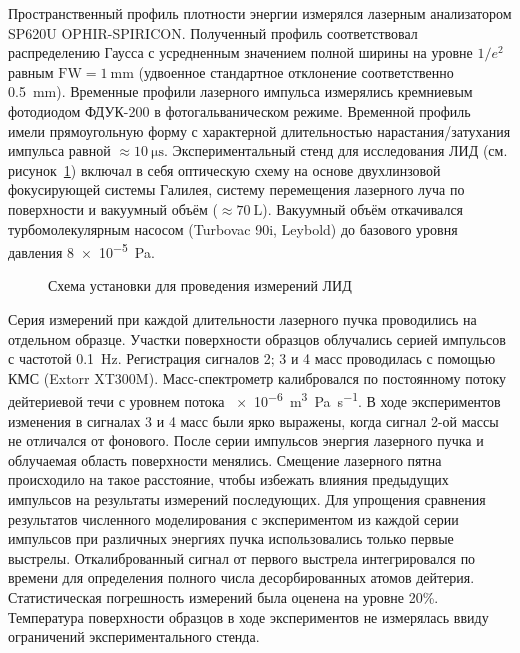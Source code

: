 Пространственный профиль плотности энергии измерялся лазерным анализатором SP620U OPHIR-SPIRICON. Полученный профиль соответствовал распределению Гаусса с усредненным значением полной ширины на уровне $1/e^2$ равным \(\mathrm{FW}=\SI{1}{\milli\metre}\) (удвоенное стандартное отклонение соответственно \SI{0.5}{\milli\meter}). Временные профили лазерного импульса измерялись кремниевым фотодиодом ФДУК-200 в фотогальваническом режиме. Временной профиль имели прямоугольную форму с характерной длительностью нарастания/затухания импульса равной \( \approx \SI{10}{\micro\second} \). Экспериментальный стенд для исследования ЛИД (см. рисунок~\ref{fig:ch4/LID_scheme}) включал в себя оптическую схему на основе двухлинзовой фокусирующей системы Галилея, систему перемещения лазерного луча по поверхности и вакуумный объём ($\approx\SI{70}{\liter}$). Вакуумный объём откачивался турбомолекулярным насосом (Turbovac 90i, Leybold) до базового уровня давления \SI{8e-5}{\pascal}.

\begin{figure}[ht]
    \caption{Схема установки для проведения измерений ЛИД~\cite{Medvedev2024}}\label{fig:ch4/LID_scheme}
\end{figure}

Серия измерений при каждой длительности лазерного пучка проводились на отдельном образце. Участки поверхности образцов облучались серией импульсов с частотой \SI{0.1}{\hertz}. Регистрация сигналов 2; 3 и 4 масс проводилась с помощью КМС (Extorr XT300M). Масс-спектрометр калибровался по постоянному потоку дейтериевой течи с уровнем потока \SI{e-6}{\metre\cubed\pascal\per\second}. В ходе экспериментов изменения в сигналах 3 и 4 масс были ярко выражены, когда сигнал 2-ой массы не отличался от фонового. После серии импульсов энергия лазерного пучка и облучаемая область поверхности менялись. Смещение лазерного пятна происходило на такое расстояние, чтобы избежать влияния предыдущих импульсов на результаты измерений последующих. Для упрощения сравнения результатов численного моделирования с экспериментом из каждой серии импульсов при различных энергиях пучка использовались только первые выстрелы. Откалиброванный сигнал от первого выстрела интегрировался по времени для определения полного числа десорбированных атомов дейтерия. Статистическая погрешность измерений была оценена на уровне 20\%. Температура поверхности образцов в ходе экспериментов не измерялась ввиду ограничений экспериментального стенда.

